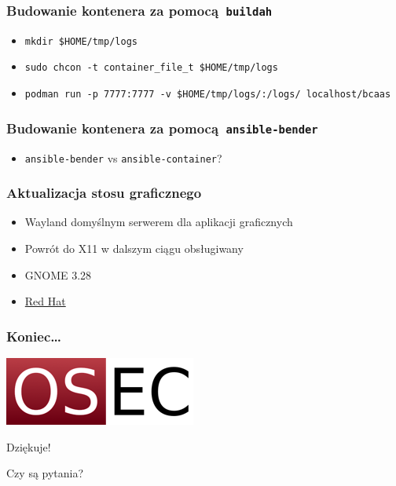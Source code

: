 \documentclass[dvipsnames,table]{beamer}
\begin{document}
\begin{frame}[fragile]
	\frametitle{Budowanie kontenera za pomocą {\tt buildah}}

\begin{itemize}
	\item {\tt mkdir \$HOME/tmp/logs}
	\item {\tt sudo chcon -t container\_file\_t \$HOME/tmp/logs}
	\item {\tt podman run -p 7777:7777 -v \$HOME/tmp/logs/:/logs/ localhost/bcaas}
\end{itemize}
\end{frame}

\begin{frame}[fragile]
	\frametitle{Budowanie kontenera za pomocą {\tt ansible-bender}}
%	
\begin{itemize}
	\item {\tt ansible-bender} vs {\tt ansible-container}?
\end{itemize}
\end{frame}

\begin{frame}[fragile]
	\frametitle{Aktualizacja stosu graficznego}
\begin{itemize}
	\item{Wayland domyślnym serwerem dla aplikacji graficznych}
	\item{Powrót do X11 w dalszym ciągu obsługiwany}
	\item{GNOME 3.28}
	\item \href{http://www.redhat.com}{Red Hat}
\end{itemize}
\end{frame}

\begin{frame}
\frametitle{Koniec\ldots}
\begin{center}
\includegraphics[scale=0.5]{img-oseclogo.png}

Dziękuje!

Czy są pytania?

\end{center}
\end{frame}
\end{document}
